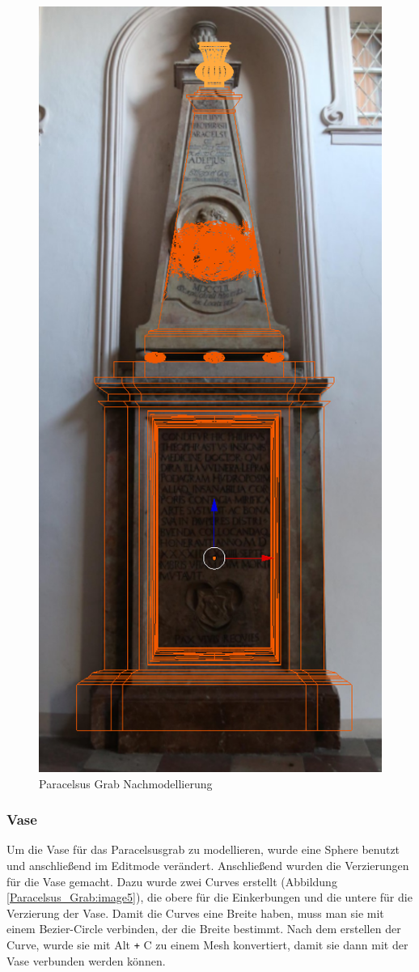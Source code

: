 \begin{figure}[h]
    \centering
    \includegraphics[width=.8\textwidth]{images/Paracelsus-Grab_Nachmodellierung.png}
    \caption{Paracelsus Grab Nachmodellierung}
    \label{Paracelsus_Grab:image2}
\end{figure}

\subsubsection{Vase}
Um die Vase für das Paracelsusgrab zu modellieren, wurde eine Sphere benutzt und anschließend im Editmode verändert. Anschließend wurden die Verzierungen für die Vase gemacht.
Dazu wurde zwei Curves erstellt (Abbildung \ref{Paracelsus_Grab:image5}), die obere für die Einkerbungen und die untere für die Verzierung der Vase. Damit die Curves eine
Breite haben, muss man sie mit einem Bezier-Circle verbinden, der die Breite bestimmt. Nach dem erstellen der Curve,
wurde sie mit Alt \verb-+- C zu einem Mesh konvertiert, damit sie dann mit der Vase verbunden werden können.

